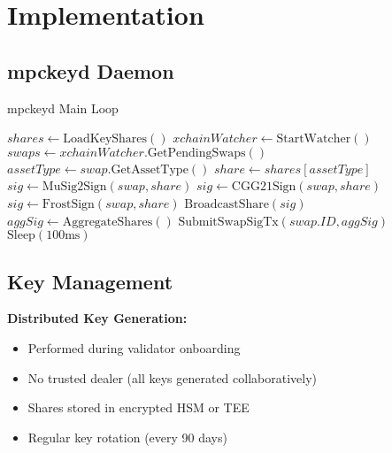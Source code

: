 \documentclass[11pt]{article}
\begin{document}
\section{Implementation}

\subsection{mpckeyd Daemon}

\begin{algorithm}[H]
\caption{mpckeyd Main Loop}
\begin{algorithmic}[1]
    \State $shares \gets \text{LoadKeyShares}()$
    \State $xchainWatcher \gets \text{StartWatcher}()$
    \State
        \State $swaps \gets xchainWatcher.\text{GetPendingSwaps}()$
            \State $assetType \gets swap.\text{GetAssetType}()$
            \State $share \gets shares[assetType]$
            \State
                \State $sig \gets \text{MuSig2Sign}(swap, share)$
                \State $sig \gets \text{CGG21Sign}(swap, share)$
                \State $sig \gets \text{FrostSign}(swap, share)$
            \EndIf
            \State
            \State $\text{BroadcastShare}(sig)$
            \State
                \State $aggSig \gets \text{AggregateShares}()$
                \State $\text{SubmitSwapSigTx}(swap.ID, aggSig)$
            \EndIf
        \EndFor
        \State $\text{Sleep}(100\text{ms})$
    \EndWhile
\EndFunction
\end{algorithmic}
\end{algorithm}

\subsection{Key Management}

\textbf{Distributed Key Generation:}
\begin{itemize}
\item Performed during validator onboarding
\item No trusted dealer (all keys generated collaboratively)
\item Shares stored in encrypted HSM or TEE
\item Regular key rotation (every 90 days)
\end{itemize}
\end{document}
